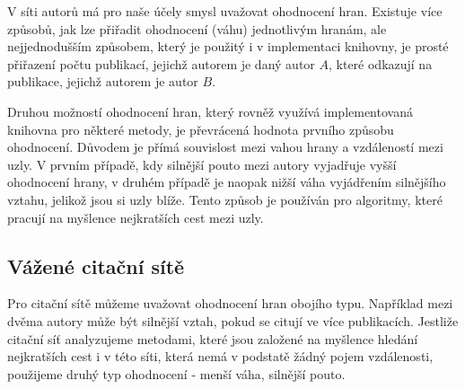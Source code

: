 \documentclass{bakalarka}
\begin{document}
V síti autorů má pro naše účely smysl uvažovat ohodnocení hran. Existuje více
způsobů, jak lze přiřadit ohodnocení (váhu) jednotlivým hranám, ale
nejjednodušším způsobem, který je použitý i v implementaci knihovny, je prosté
přiřazení počtu publikací, jejichž autorem je daný autor $A$, které odkazují na
publikace, jejichž autorem je autor $B$.

Druhou možností ohodnocení hran, který rovněž využívá implementovaná knihovna
pro některé metody, je převrácená hodnota prvního způsobu ohodnocení. Důvodem
je přímá souvislost mezi vahou hrany a vzdáleností mezi uzly. V prvním případě,
kdy silnější pouto mezi autory vyjadřuje vyšší ohodnocení hrany, v druhém
případě je naopak nižší váha vyjádřením silnějšího vztahu, jelikož jsou si uzly
blíže. Tento způsob je používán pro algoritmy, které pracují na myšlence
nejkratších cest mezi uzly. 

\subsection{Vážené citační sítě}
Pro citační sítě můžeme uvažovat ohodnocení hran obojího typu. Například mezi
dvěma autory může být silnější vztah, pokud se citují ve více publikacích.
Jestliže citační síť analyzujeme metodami, které jsou založené na myšlence
hledání nejkratších cest i v této síti, která nemá v podstatě žádný pojem
vzdálenosti, použijeme druhý typ ohodnocení - menší váha, silnější pouto.
\end{document}
